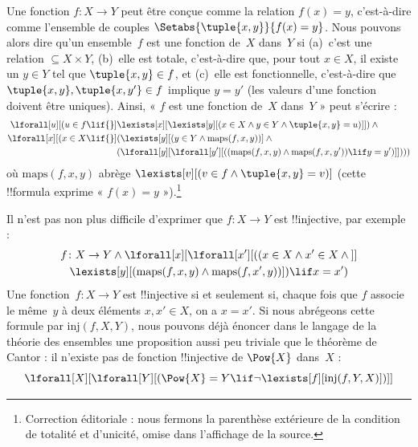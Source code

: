 \documentclass[../../../include/open-logic-section]{subfiles}
\begin{document}
Une fonction $f \colon X \to Y$ peut être conçue comme la relation
$f(x) = y$, c'est-à-dire comme l'ensemble de couples
$\Setabs{\tuple{x,y}}{f(x) = y}$. Nous pouvons alors dire qu'un
ensemble~$f$ est une fonction de~$X$ dans~$Y$ si (a)~c'est une
relation $\subseteq X \times Y$, (b)~elle est totale, c'est-à-dire
que, pour tout $x \in X$, il existe un $y \in Y$ tel que
$\tuple{x, y} \in f$, et (c)~elle est fonctionnelle, c'est-à-dire
que $\tuple{x, y}, \tuple{x, y'} \in f$ implique $y = y'$ (les
valeurs d'une fonction doivent être uniques). Ainsi, « $f$ est une
fonction de~$X$ dans~$Y$ » peut s'écrire :
\begin{align*}
 \lforall[u][(u \in f \lif {}] & \lexists[x][\lexists[y][(x \in X \land y \in
      Y \land \tuple{x, y} = u)]]) \land {}\\
 \lforall[x][(x \in X \lif {}] &
      (\lexists[y][(y \in Y \land \mathrm{maps}(f, x, y))] \land {}\\
& (\lforall[y][\lforall[y'][((\mathrm{maps}(f, x, y) \land
    \mathrm{maps}(f, x, y')) \lif y = y')]])))
\end{align*}
où $\mathrm{maps}(f, x, y)$ abrège $\lexists[v][(v \in f \land
  \tuple{x, y} = v)]$ (cette !!{formula} exprime « $f(x) = y$ »).\footnote{Correction éditoriale : nous fermons la parenthèse extérieure de la condition de totalité et d'unicité, omise dans l'affichage de la source.}

Il n'est pas non plus difficile d'exprimer que $f\colon X \to Y$
est !!{injective}, par exemple :
\begin{multline*}
 f \colon X \to Y \land \lforall[x][\lforall[x'][((x \in X \land x' \in
     X \land {}]] \\
 \lexists[y][(\mathrm{maps}(f, x, y) \land \mathrm{maps}(f,
        x', y))]) \lif x = x')
\end{multline*}
Une fonction~$f\colon X \to Y$ est !!{injective} si et seulement
si, chaque fois que $f$ associe le même~$y$ à deux éléments
$x, x' \in X$, on a $x = x'$. Si nous abrégeons cette formule par
$\mathrm{inj}(f, X, Y)$, nous pouvons déjà énoncer dans le langage
de la théorie des ensembles une proposition aussi peu triviale que
le théorème de Cantor : il n'existe pas de fonction !!{injective}
de $\Pow{X}$ dans~$X$ :
\[
\lforall[X][\lforall[Y][(\Pow{X} = Y \lif
    \lnot\lexists[f][\mathrm{inj}(f, Y, X)])]]
\]
\end{document}
